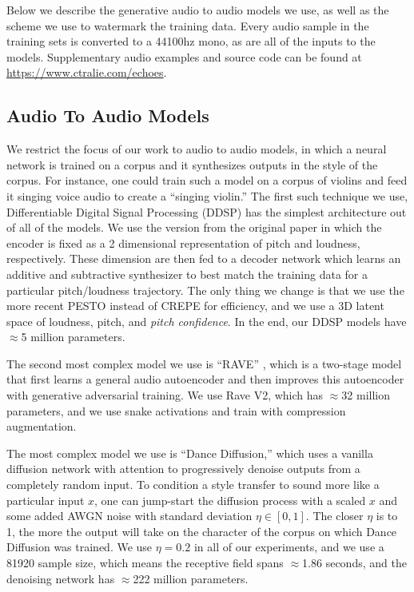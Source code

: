 \documentclass[letterpaper]{article} %
\begin{document}
Below we describe the generative audio to audio models we use, as well as the scheme we use to watermark the training data. Every audio sample in the training sets is converted to a 44100hz mono, as are all of the inputs to the models.  Supplementary audio examples and source code can be found at \url{https://www.ctralie.com/echoes}.

\subsection{Audio To Audio Models}

We restrict the focus of our work to audio to audio models, in which a neural network is trained on a corpus and it synthesizes outputs in the style of the corpus.  For instance, one could train such a model on a corpus of violins and feed it singing voice audio to create a ``singing violin.''  The first such technique we use, Differentiable Digital Signal Processing (DDSP) \cite{engelddsp} has the simplest architecture out of all of the models.  We use the version from the original paper in which the encoder is fixed as a 2 dimensional representation of pitch and loudness, respectively.  These dimension are then fed to a decoder network which learns an additive and subtractive synthesizer to best match the training data for a particular pitch/loudness trajectory.  The only thing we change is that we use the more recent PESTO \cite{riou2023pesto} instead of CREPE \cite{kim2018crepe} for efficiency, and we use a 3D latent space of loudness, pitch, and {\em pitch confidence}.  In the end, our DDSP models have $\approx$5 million parameters.


The second most complex model we use is ``RAVE'' \cite{caillon2021rave}, which is a two-stage model that first learns a general audio autoencoder and then improves this autoencoder with generative adversarial training.  We use Rave V2, which has $\approx$32 million parameters, and we use snake activations and train with compression augmentation. 

The most complex model we use is ``Dance Diffusion,'' which uses a vanilla diffusion network \cite{sohl2015deep} with attention to progressively denoise outputs from a completely random input.  To condition a style transfer to sound more like a particular input $x$, one can jump-start the diffusion process with a scaled $x$ and some added AWGN noise with standard deviation $\eta \in [0, 1]$.  The closer $\eta$ is to 1, the more the output will take on the character of the corpus on which Dance Diffusion was trained.  We use $\eta=0.2$ in all of our experiments, and we use a 81920 sample size, which means the receptive field spans $\approx$1.86 seconds, and the denoising network has $\approx$222 million parameters.%
\end{document}
